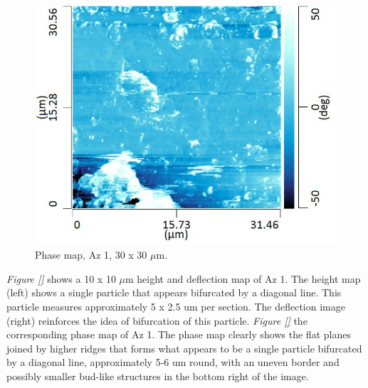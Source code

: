 \begin{figure}[H]
\centering
  \includegraphics[width=.45\textwidth]{Az1_tapping_mode_240521_phase_2}
\caption[Phase map, Az 1]{Phase map, Az 1, 30 x 30 $\mu$m.}
\label{fig:afm_az1_phase_2}
\end{figure}


\textit{Figure \ref{}} shows a 10 x 10 $\mu$m height and deflection map of Az 1. The height map (left) shows a single particle that appears bifurcated by a diagonal line. This particle measures approximately 5 x 2.5 um per section. The deflection image (right) reinforces the idea of bifurcation of this particle. \textit{Figure \ref{}} the corresponding phase map of Az 1. The phase map clearly shows the flat planes joined by higher ridges that forms what appears to be a single particle bifurcated by a diagonal line, approximately 5-6 um round, with an uneven border and possibly smaller bud-like structures in the bottom right of the image.


